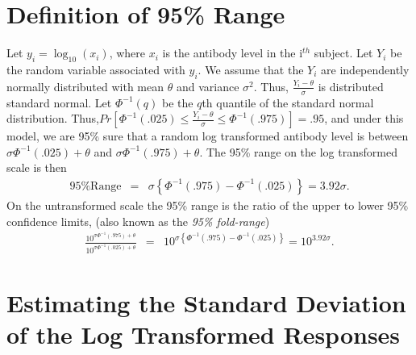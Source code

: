 \documentclass{article}[12pt]
\begin{document}
\section{Definition of 95\% Range}
\label{sec:defn}


Let $y_i =\log_{10}(x_i)$, where $x_i$ is the antibody level in the 
i$^{th}$ subject. Let $Y_i$ be the random variable associated with 
$y_i$. We assume that the $Y_i$ are independently normally 
distributed  with mean $\theta$ and variance $\sigma^2$.  Thus, 
$\frac{Y_i - \theta}{\sigma}$ is distributed standard normal.
Let $\Phi^{-1}(q)$ be the $q$th quantile of the standard normal 
distribution. Thus,$Pr[\Phi^{-1}(.025) \leq \frac{Y_i -\theta}{\sigma} 
\leq \Phi^{-1}(.975)]=.95$, and under this model, we are 95\% sure 
that a random log transformed antibody level is between $\sigma 
\Phi^{-1}(.025)+\theta$    and $\sigma \Phi^{-1}(.975)+\theta$. The 95\% 
range on the log transformed scale is then
\begin{eqnarray*}
\mbox{95\% Range} & = & \sigma \left\{ 
\Phi^{-1}(.975)-\Phi^{-1}(.025)\right\} = 3.92 \sigma.
\end{eqnarray*}
On the untransformed scale the 95\% range is the ratio of the upper 
to lower 95\% confidence limits, (also known as the {\it 95\% 
fold-range}) 
\begin{eqnarray*}
\frac{10^{\sigma \Phi^{-1}(.975)+\theta} }{ 10^{\sigma 
\Phi^{-1}(.025)+\theta} } & = & 10^{\sigma \left\{ 
\Phi^{-1}(.975)-\Phi^{-1}(.025)\right\} } = 10^{3.92\sigma}.
\end{eqnarray*}

\section{Estimating the Standard Deviation of the Log Transformed 
Responses}
\label{sec:estsd}
\end{document}
